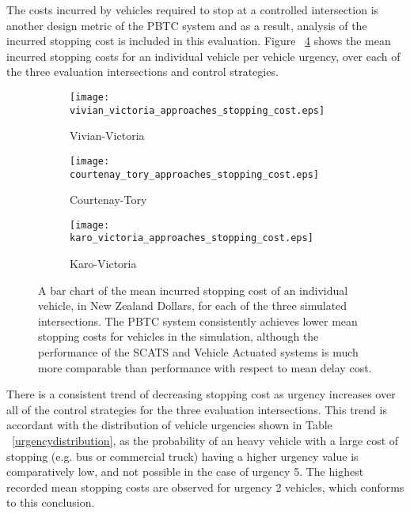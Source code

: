 {The costs incurred by vehicles required to stop at a controlled intersection is another design metric of the PBTC system and as a result, analysis of the incurred stopping cost is included in this evaluation. Figure ~\ref{eval:mean_stopping_cost} shows the mean incurred stopping costs for an individual vehicle per vehicle urgency, over each of the three evaluation intersections and control strategies. 

\begin{figure}
\centering
\begin{subfigure}{.5\textwidth}
  \centering
  \texttt{[image: vivian\_victoria\_approaches\_stopping\_cost.eps]}
  \caption{Vivian-Victoria}
  \label{mean_stopping_cost:sub1}
\end{subfigure}%
\begin{subfigure}{.5\textwidth}
  \centering
  \texttt{[image: courtenay\_tory\_approaches\_stopping\_cost.eps]}
  \caption{Courtenay-Tory}
  \label{mean_stopping_cost:sub2}
\end{subfigure}

\vspace{1cm}

\begin{subfigure}{.5\textwidth}
  \centering
  \texttt{[image: karo\_victoria\_approaches\_stopping\_cost.eps]}
  \caption{Karo-Victoria}
  \label{mean_stopping_cost:sub3}
\end{subfigure}%
\caption{ A bar chart of the mean incurred stopping cost of an individual vehicle, in New Zealand Dollars, for each of the three simulated intersections. The PBTC system consistently achieves lower mean stopping costs for vehicles in the simulation, although the performance of the SCATS and Vehicle Actuated systems is much more comparable than performance with respect to mean delay cost.   }
\label{eval:mean_stopping_cost}
\end{figure}

There is a consistent trend of decreasing stopping cost as urgency increases over all of the control strategies for the three evaluation intersections. This trend is accordant with the distribution of vehicle urgencies shown in Table ~\ref{urgencydistribution}, as the probability of an heavy vehicle with a large cost of stopping (e.g. bus or commercial truck) having a higher urgency value is comparatively low, and not possible in the case of urgency 5. The highest recorded mean stopping costs are observed for urgency 2 vehicles, which conforms to this conclusion. %

}
